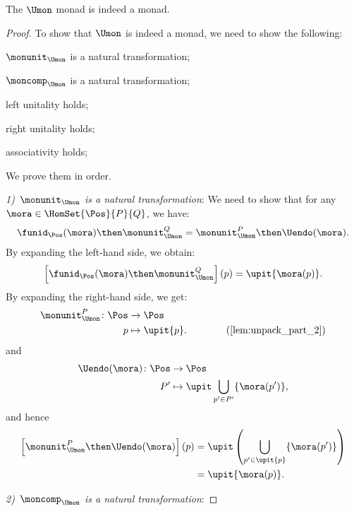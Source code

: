 \begin{lemma}
  The $\Umon$ monad is indeed a monad.
\end{lemma}
\begin{proof}
  To show that $\Umon$ is indeed a monad, we need to show the following:
  \begin{compactenum}
    \item $\monunit_{\Umon}$ is a natural transformation;
    \item $\moncomp_{\Umon}$ is a natural transformation;
    \item left unitality holds;
    \item right unitality holds;
    \item associativity holds;
  \end{compactenum}
  We prove them in order.

  \emph{1)~$\monunit_{\Umon}$ is a natural transformation}: We need to show that for any~$\mora\in \HomSet{\Pos}{P}{Q}$, we have:
  \begin{equation}
    \funid_{\Pos}(\mora)\then \monunit_{\Umon}^Q=\monunit_{\Umon}^P\then \Uendo(\mora).
  \end{equation}
  By expanding the left-hand side, we obtain:
  \begin{equation}
    \left[\funid_{\Pos}(\mora)\then \monunit_{\Umon}^Q\right](p)=\upit \{\mora(p)\}.
  \end{equation}
  By expanding the right-hand side, we get:
  \begin{equation}
    \begin{aligned}
      \monunit_{\Umon}^P\colon \Pos &\to \Pos\\
      p&\mapsto \upit \{p\}. \qquad \qquad (\cref{lem:unpack_part_2})
    \end{aligned}
  \end{equation}
  and
  \begin{equation}
    \begin{aligned}
      \Uendo(\mora)\colon \Pos &\to \Pos\\
      P'&\mapsto \upit \bigcup_{p'\in P'}\{\mora(p')\},
    \end{aligned}
  \end{equation}
  and hence
  \begin{equation}
    \begin{aligned}
      \left[\monunit_{\Umon}^P\then \Uendo(\mora)\right](p)&=\upit \left( \bigcup_{p'\in \upit \{p\}} \{\mora(p')\}\right)\\
      &=\upit \{\mora(p)\}.
    \end{aligned}
  \end{equation}

  \emph{2)~$\moncomp_{\Umon}$ is a natural transformation}:
\end{proof}
